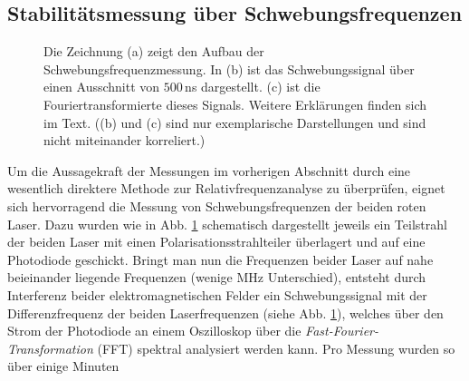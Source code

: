 \subsection{Stabilitätsmessung über
Schwebungsfrequenzen}\label{subsec:beatfrequenzmessung}
\begin{figure}[hp]
 	\centering
 	\footnotesize
	\caption[Beatfrequenzmessung]{Die Zeichnung (a) zeigt den Aufbau der
	Schwebungsfrequenzmessung. In (b) ist das Schwebungssignal über einen
	Ausschnitt von $500\,$ns dargestellt. (c) ist die Fouriertransformierte dieses
	Signals. Weitere Erklärungen finden sich im Text. ((b) und (c) sind nur
	exemplarische Darstellungen und sind nicht miteinander korreliert.)}
	\label{fig:beatfrequenzmessung}
\end{figure}
Um die Aussagekraft der Messungen im vorherigen Abschnitt durch eine wesentlich
direktere Methode zur Relativfrequenzanalyse zu überprüfen, eignet sich hervorragend die
Messung von Schwebungsfrequenzen der beiden roten Laser. Dazu wurden wie in Abb.
\ref{fig:beatfrequenzmessung}
schematisch dargestellt jeweils ein Teilstrahl der beiden Laser mit einen Polarisationsstrahlteiler
überlagert und auf eine Photodiode geschickt. Bringt man nun die Frequenzen
beider Laser auf nahe beieinander liegende Frequenzen (wenige MHz
Unterschied), entsteht durch Interferenz beider
elektromagnetischen Felder ein Schwebungssignal mit der Differenzfrequenz der
beiden Laserfrequenzen (siehe Abb.
\ref{fig:beatfrequenzmessung}), welches über den Strom der Photodiode an einem Oszilloskop über die \textit{Fast-Fourier-Transformation} (FFT)
spektral analysiert werden kann. Pro Messung wurden so über einige Minuten
